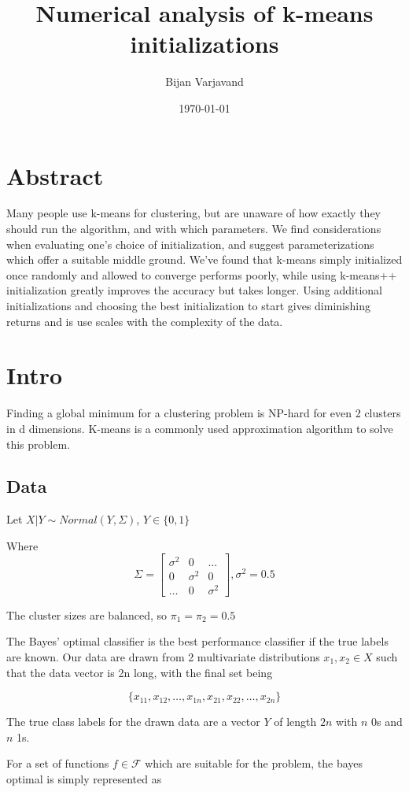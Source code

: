 \documentclass{article}
\title{Numerical analysis of k-means initializations}
\author{Bijan Varjavand}
\date{\today}
\begin{document}
\maketitle
\section{Abstract}
Many people use k-means for clustering, but are unaware of how exactly they should run the algorithm, and with which parameters.
We find considerations when evaluating one's choice of initialization, and suggest parameterizations which offer a suitable middle ground.
We've found that k-means simply initialized once randomly and allowed to converge performs poorly, while using k-means++ initialization greatly improves the accuracy but takes longer.
Using additional initializations and choosing the best initialization to start gives diminishing returns and is use scales with the complexity of the data.

\section{Intro}
Finding a global minimum for a clustering problem is NP-hard for even 2 clusters in d dimensions. K-means is a commonly used approximation algorithm to solve this problem.

\subsection{Data}
Let $X|Y \sim Normal(Y,\Sigma)$, $Y \in \{0,1\}$

Where
\[\Sigma = \begin{bmatrix}\sigma^2 & 0 & \dots\\0 & \sigma^2 & 0\\\dots&0&\sigma^2\end{bmatrix}, \sigma^2 = 0.5\]

The cluster sizes are balanced, so $\pi_1 = \pi_2 = 0.5$

The Bayes' optimal classifier is the best performance classifier if the true labels are known. Our data are drawn from 2 multivariate distributions $x_1,x_2 \in X$ such that the data vector is 2n long, with the final set being

$$\{x_{11}, x_{12}, \dots, x_{1n}, x_{21}, x_{22}, \dots, x_{2n}\}$$

The true class labels for the drawn data are a vector $Y$ of length $2n$ with $n$ 0s and $n$ 1s.

For a set of functions $f \in \mathcal{F}$ which are suitable for the problem, the bayes optimal is simply represented as
\end{document}
